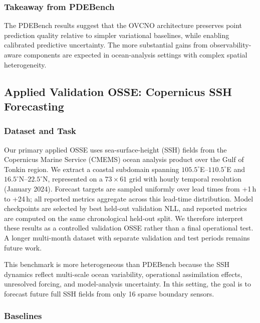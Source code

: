 \documentclass[11pt,a4paper]{article}
\begin{document}
\subsubsection{Takeaway from PDEBench}

The PDEBench results suggest that the OVCNO architecture preserves point prediction quality relative to simpler variational baselines, while enabling calibrated predictive uncertainty. The more substantial gains from observability-aware components are expected in ocean-analysis settings with complex spatial heterogeneity.

\subsection{Applied Validation OSSE: Copernicus SSH Forecasting}
\label{sec:copernicus}

\subsubsection{Dataset and Task}

Our primary applied OSSE uses sea-surface-height (SSH) fields from the Copernicus Marine Service (CMEMS) ocean analysis product over the Gulf of Tonkin region. We extract a coastal subdomain spanning $105.5^\circ$E--$110.5^\circ$E and $16.5^\circ$N--$22.5^\circ$N, represented on a $73 \times 61$ grid with hourly temporal resolution (January 2024). Forecast targets are sampled uniformly over lead times from +1\,h to +24\,h; all reported metrics aggregate across this lead-time distribution. Model checkpoints are selected by best held-out validation NLL, and reported metrics are computed on the same chronological held-out split. We therefore interpret these results as a controlled validation OSSE rather than a final operational test. A longer multi-month dataset with separate validation and test periods remains future work.

This benchmark is more heterogeneous than PDEBench because the SSH dynamics reflect multi-scale ocean variability, operational assimilation effects, unresolved forcing, and model-analysis uncertainty. In this setting, the goal is to forecast future full SSH fields from only 16 sparse boundary sensors.

\subsubsection{Baselines}
\end{document}
